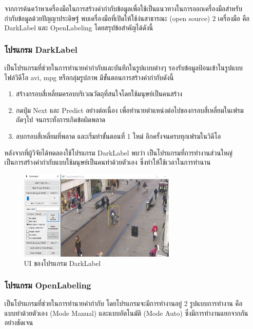 จากการค้นคว้าหาเครื่องมือในการสร้างคำกำกับข้อมูลเพื่อใช้เป็นแนวทางในการออกเครื่องมือสำหรับกำกับข้อมูลด้วยปัญญาประดิษฐ์ พบเครื่องมือที่เปิดให้ใช้ง่นสาธารณะ (open source) 2 เครื่องมือ 
คือ DarkLabel และ OpenLabeling โดยสรุปข้อสำคัญได้ดังนี้ 
\subsubsection*{โปรแกรม DarkLabel}
เป็นโปรแกรมที่ช่วยในการทำนายคำกำกับและบันทึกในรูปแบบต่างๆ รองรับข้อมูลป้อนเข้าในรูปแบบไฟล์วิดีโอ avi, mpg หรือกลุ่มรูปภาพ มีขั้นตอนการสร้างคำกำกับดังนี้ 
\begin{enumerate}
	\setlength\itemsep{-0.25em}
	\item สร้างกรอบสี่เหลี่ยมครอบบริเวณวัตถุที่สนใจโดยใช้มนุษย์เป็นคนสร้าง
	\item กดปุ่ม Next และ Predict อย่างต่อเนื่อง เพื่อทำนายตำแหน่งต่อไปของกรอบสี่เหลี่ยมในเฟรมถัดๆไป จนกระทั่งการเกิดข้อผิดพลาด
	\item ลบกรอบสี่เหลี่ยมที่พลาด และเริ่มทำขั้นตอนที่ 1 ใหม่ อีกครั้งจนครบทุกเฟรมในวิดีโอ
\end{enumerate}
หลังจากที่ผู้วิจัยได้ทดลองใช้โปรแกรม DarkLabel พบว่า เป็นโปรแกรมที่การทำงานส่วนใหญ่เป็นการสร้างคำกำกับแบบใช้มนุษย์เป็นคนทำด้วยตัวเอง ซึ่งทำให้ใช้เวลาในการทำนาน

\begin{figure}[!ht]
	\centering
	\includegraphics[width=0.7\textwidth]{chapter2/images/darklabel.png}
		\caption{UI ของโปรแกรม DarkLabel}
    	\label{fig:darklabel}
\end{figure}
\clearpage

\subsubsection*{โปรแกรม OpenLabeling}
เป็นโปรแกรมที่ช่วยในการทำนายคำกำกับ โดยโปรแกรมจะมีการทำงานอยู่ 2 รูปแบบการทำงาน คือแบบทำด้วยตัวเอง (Mode Manual) และแบบอัตโนมัติ (Mode Auto) ซึ่งมีการทำงานแยกจากกันอย่างชัดเจน 

